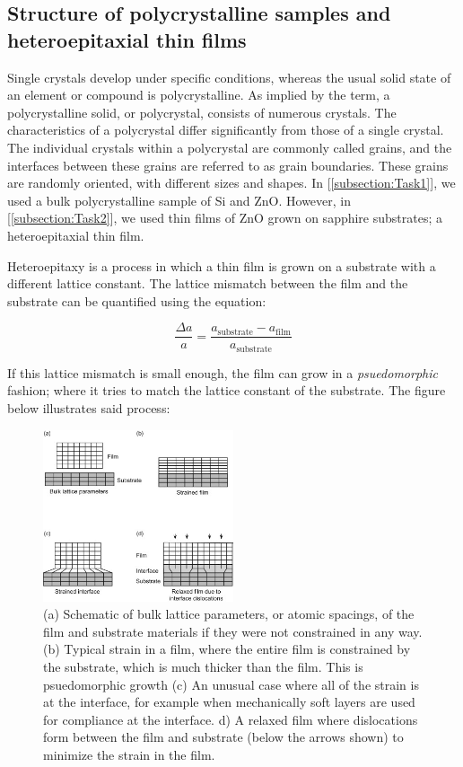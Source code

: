 \documentclass{article}
\begin{document}
\subsection{Structure of polycrystalline samples and heteroepitaxial thin films}

Single crystals develop under specific conditions, whereas the usual solid state of an element or compound is polycrystalline. As implied by the term, a polycrystalline solid, or polycrystal, consists of numerous crystals. The characteristics of a polycrystal differ significantly from those of a single crystal. The individual crystals within a polycrystal are commonly called grains, 
and the interfaces between these grains are referred to as grain boundaries. These grains are randomly oriented, with different sizes and shapes. In [\ref{subsection:Task1}], we used a bulk polycrystalline sample of Si and ZnO. However, in [\ref{subsection:Task2}], we used thin films of ZnO grown on sapphire substrates; a heteroepitaxial thin film. 

Heteroepitaxy is a process in which a thin film is grown on a substrate with a different lattice constant. The lattice mismatch between the film and the substrate can be quantified using the equation:

\begin{equation}
	\label{eq:latticemismatch}
	\frac{\Delta a}{a} = \frac{a_{\text{substrate}} - a_{\text{film}}}{a_{\text{substrate}}}
\end{equation}

If this lattice mismatch is small enough, the film can grow in a \textit{psuedomorphic} fashion; where it tries to match the lattice constant of the substrate. The figure below illustrates said process:

\begin{figure}[h]
	\centering
	\includegraphics[width=0.5\textwidth]{Figures/Heteroepitaxy.jpg}
	\caption{(a) Schematic of bulk lattice parameters, or atomic spacings, of the film and substrate materials if they were not constrained in any way. (b) Typical strain in a film, where the entire film is constrained by the substrate, which is much thicker than the film. This is psuedomorphic growth (c) An unusual case where all of the strain is at the interface, for example when mechanically soft layers are used for compliance at the interface. d) A relaxed film where dislocations form between the film and substrate (below the arrows shown) to minimize the strain in the film. \cite{buschow_2001_encyclopedia}}
	\label{fig:epitaxy}
\end{figure}
\end{document}
